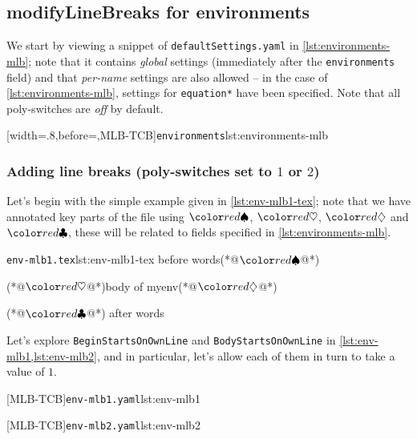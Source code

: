 \subsection{modifyLineBreaks for environments}
We start by viewing a snippet of \texttt{defaultSettings.yaml} in \cref{lst:environments-mlb}; note that it contains \emph{global} settings (immediately
after the \texttt{environments} field) and that \emph{per-name} settings are also allowed -- in the case of \cref{lst:environments-mlb}, settings 
for \texttt{equation*} have been specified. Note that all poly-switches are \emph{off} by default.

[width=.8\linewidth,before=\centering,MLB-TCB]{\texttt{environments}}{lst:environments-mlb}

\subsubsection{Adding line breaks (poly-switches set to $1$ or $2$)}
Let's begin with the simple example given in \cref{lst:env-mlb1-tex}; note that we have annotated key parts of the file using $\BeginStartsOnOwnLine$, 
$\BodyStartsOnOwnLine$, $\EndStartsOnOwnLine$ and $\EndFinishesWithLineBreak$, these will be related to fields specified in \cref{lst:environments-mlb}.

\begin{cmhlistings}[escapeinside={(*@}{@*)}]{\texttt{env-mlb1.tex}}{lst:env-mlb1-tex}
before words(*@$\BeginStartsOnOwnLine$@*) \begin{myenv}(*@$\BodyStartsOnOwnLine$@*)body of myenv(*@$\EndStartsOnOwnLine$@*)\end{myenv}(*@$\EndFinishesWithLineBreak$@*) after words
\end{cmhlistings}

Let's explore \texttt{BeginStartsOnOwnLine} and \texttt{BodyStartsOnOwnLine} in \cref{lst:env-mlb1,lst:env-mlb2}, and in particular, 
let's allow each of them in turn to take a value of $1$.

\begin{minipage}{.45\textwidth}
[MLB-TCB]{\texttt{env-mlb1.yaml}}{lst:env-mlb1}
\end{minipage}
\hfill
\begin{minipage}{.45\textwidth}
[MLB-TCB]{\texttt{env-mlb2.yaml}}{lst:env-mlb2}
\end{minipage}

